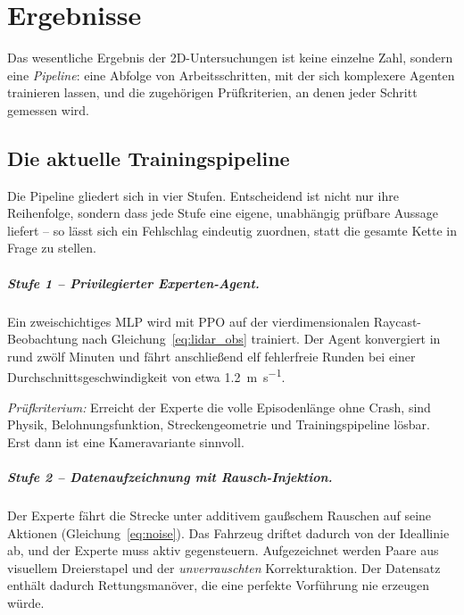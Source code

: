 \chapter{Ergebnisse}
\label{chap:ergebnisse}

Das wesentliche Ergebnis der 2D-Untersuchungen ist keine einzelne Zahl, sondern eine \emph{Pipeline}: eine Abfolge von Arbeitsschritten, mit der sich komplexere Agenten trainieren lassen, und die zugehörigen Prüfkriterien, an denen jeder Schritt gemessen wird.

\section{Die aktuelle Trainingspipeline}
\label{sec:ergebnisse_pipeline}

Die Pipeline gliedert sich in vier Stufen. Entscheidend ist nicht nur ihre Reihenfolge, sondern dass jede Stufe eine eigene, unabhängig prüfbare Aussage liefert -- so lässt sich ein Fehlschlag eindeutig zuordnen, statt die gesamte Kette in Frage zu stellen.

\paragraph{Stufe 1 -- Privilegierter Experten-Agent.}
Ein zweischichtiges \ac{MLP} wird mit \ac{PPO} auf der vierdimensionalen Raycast-Beobachtung nach Gleichung~\eqref{eq:lidar_obs} trainiert. Der Agent konvergiert in rund zwölf Minuten und fährt anschließend elf fehlerfreie Runden bei einer Durchschnittsgeschwindigkeit von etwa \SI{1.2}{\meter\per\second}.

\emph{Prüfkriterium:} Erreicht der Experte die volle Episodenlänge ohne Crash, sind Physik, Belohnungsfunktion, Streckengeometrie und Trainingspipeline lösbar. Erst dann ist eine Kameravariante sinnvoll.

\paragraph{Stufe 2 -- Datenaufzeichnung mit Rausch-Injektion.}
Der Experte fährt die Strecke unter additivem gaußschem Rauschen auf seine Aktionen (Gleichung~\eqref{eq:noise}). Das Fahrzeug driftet dadurch von der Ideallinie ab, und der Experte muss aktiv gegensteuern. Aufgezeichnet werden Paare aus visuellem Dreierstapel und der \emph{unverrauschten} Korrekturaktion. Der Datensatz enthält dadurch Rettungsmanöver, die eine perfekte Vorführung nie erzeugen würde.

